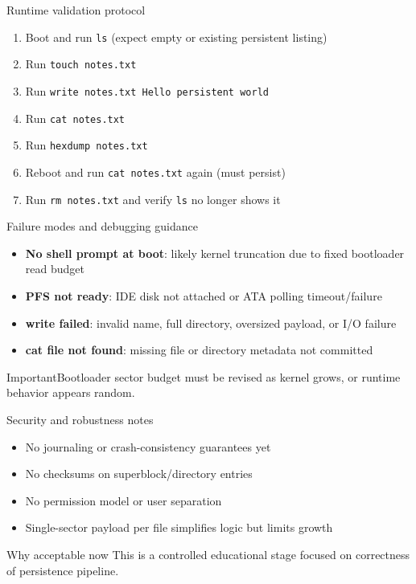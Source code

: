 \documentclass[aspectratio=169]{beamer}
\newcommand{\concept}[2]{%
  \begin{block}{#1}\smallskip #2\smallskip\end{block}\vspace{5pt}}
\newcommand{\warn}[1]{%
  \begin{alertblock}{Important}\smallskip #1\smallskip\end{alertblock}\vspace{5pt}}
\begin{document}
\begin{frame}{Runtime validation protocol}
  \begin{enumerate}
    \item Boot and run \texttt{ls} (expect empty or existing persistent listing)
    \item Run \texttt{touch notes.txt}
    \item Run \texttt{write notes.txt Hello persistent world}
    \item Run \texttt{cat notes.txt}
    \item Run \texttt{hexdump notes.txt}
    \item Reboot and run \texttt{cat notes.txt} again (must persist)
    \item Run \texttt{rm notes.txt} and verify \texttt{ls} no longer shows it
  \end{enumerate}
\end{frame}

\begin{frame}{Failure modes and debugging guidance}
  \begin{itemize}
    \item \textbf{No shell prompt at boot}: likely kernel truncation due to fixed bootloader read budget
    \item \textbf{PFS not ready}: IDE disk not attached or ATA polling timeout/failure
    \item \textbf{write failed}: invalid name, full directory, oversized payload, or I/O failure
    \item \textbf{cat file not found}: missing file or directory metadata not committed
  \end{itemize}
  \warn{Bootloader sector budget must be revised as kernel grows, or runtime behavior appears random.}
\end{frame}

\begin{frame}{Security and robustness notes}
  \begin{itemize}
    \item No journaling or crash-consistency guarantees yet
    \item No checksums on superblock/directory entries
    \item No permission model or user separation
    \item Single-sector payload per file simplifies logic but limits growth
  \end{itemize}
  \concept{Why acceptable now}{
    This is a controlled educational stage focused on correctness of persistence pipeline.
  }
\end{frame}
\end{document}
